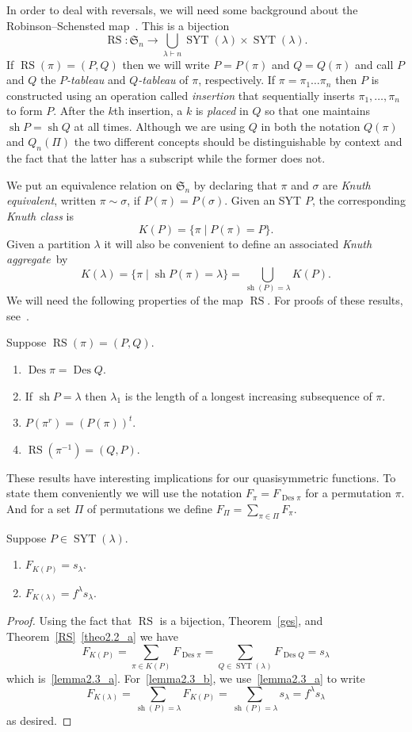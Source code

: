 \documentclass[ALCO,ThmDefs,Unicode,epreuves]{cedram}
\DeclareMathOperator{\RS}{RS}
\newcommand{\ptn}{\vdash}
\newcommand{\ra}{\rightarrow}
\newcommand{\la}{\lambda}
\newcommand{\si}{\sigma}
\newcommand{\fS}{{\mathfrak S}}
\DeclareMathOperator{\Des}{Des}
\DeclareMathOperator{\sh}{sh}
\DeclareMathOperator{\SYT}{SYT}
\begin{document}
In order to deal with reversals, we will need some background about the Robinson--Schensted map~\cite{rob:rsg,sch:lid}. This is a bijection
\[
\RS:\fS_n\ra\bigcup_{\la\ptn n} \SYT(\la)\times\SYT(\la).
\]
If $\RS(\pi)=(P,Q)$ then we will write $P=P(\pi)$ and $Q=Q(\pi)$ and call $P$ and $Q$ the \emph{$P$-tableau} and \emph{$Q$-tableau} of $\pi$, respectively.
If $\pi=\pi_1\dots\pi_n$ then $P$ is constructed using an operation called \emph{insertion} that sequentially inserts $\pi_1,\dots,\pi_n$ to form $P$. After the $k$th insertion, a $k$ is \emph{placed} in $Q$ so that one maintains $\sh P=\sh Q$ at all times. Although we are using $Q$ in both the notation $Q(\pi)$ and $Q_n(\Pi)$ the two different concepts should be distinguishable by context and the fact that the latter has a subscript while the former does not. 

We put an equivalence relation on $\fS_n$ by declaring that $\pi$ and $\si$ are \emph{Knuth equivalent}, written $\pi\sim\si$, if $P(\pi)=P(\si)$. Given an SYT $P$, the corresponding \emph{Knuth class} is
\[
K(P) = \{\pi \mid P(\pi)=P\}.
\]
Given a partition $\la$ it will also be convenient to define an associated \emph{Knuth aggregate}~by
\[
K(\la) = \{\pi \mid \sh P(\pi) = \la\} =\bigcup_{\sh(P)=\la} K(P).
\]
We will need the following properties of the map $\RS$. For proofs of these results, see~\cite{sta:ec2}.
\begin{theo}
\label{RS}
Suppose $\RS(\pi)=(P,Q)$.
\begin{enumerate}
\item\label{theo2.2_a} %
$\Des\pi=\Des Q$.
\item\label{theo2.2_b} %
If $\sh P=\la$ then $\la_1$ is the length of a longest increasing subsequence of $\pi$.
\item\label{theo2.2_c} %
$P(\pi^r) = (P(\pi))^t$.
\item\label{theo2.2_d} %
$\RS(\pi^{-1}) = (Q,P)$. %
\end{enumerate}
\end{theo}

These results have interesting implications for our quasisymmetric functions. To state them conveniently we will use the notation 
$F_\pi=F_{\Des\pi}$ for a permutation $\pi$. And for a set $\Pi$ of permutations we define $F_\Pi=\sum_{\pi\in\Pi} F_\pi$.
\begin{lemma}
\label{knuth}
Suppose $P\in\SYT(\la)$.
\begin{enumerate}
\item\label{lemma2.3_a} %
$F_{K(P)} = s_\la$.
\item\label{lemma2.3_b} %
$F_{K(\la)} = f^\la s_\la$.
\end{enumerate}
\end{lemma}
\begin{proof}
Using the fact that $\RS$ is a bijection, Theorem~\ref{ges}, and Theorem~\ref{RS}~\eqref{theo2.2_a} we have
\[
F_{K(P)} = \sum_{\pi\in K(P)} F_{\Des\pi} = \sum_{Q\in\SYT(\la)} F_{\Des Q} = s_\la
\]
which is~\eqref{lemma2.3_a}. For~\eqref{lemma2.3_b}, we use~\eqref{lemma2.3_a} to write
\[
F_{K(\la)} = \sum_{\sh(P)=\la} F_{K(P)} = \sum_{\sh(P)=\la} s_\la = f^\la s_\la
\]
as desired.
\end{proof}
\end{document}
